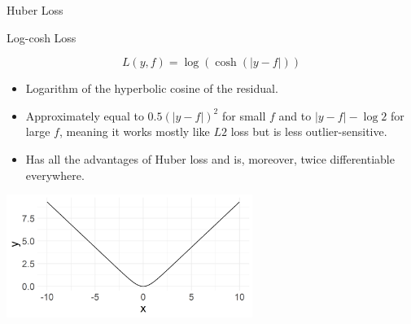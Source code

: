 \documentclass[11pt,compress,t,notes=noshow, xcolor=table]{beamer}
\begin{document}
\begin{vbframe}{Huber Loss}


\end{vbframe}

\begin{vbframe}{Log-cosh Loss}


$$
L(y,f) = \log \left( \cosh(\left|y - f\right|) \right)
$$

\normalsize
\begin{itemize}
\item Logarithm of the hyperbolic cosine of the residual.
\item Approximately equal to $0.5 (\left|y - f\right|)^2$ for small $f$ and to $\left|y - f\right| - \log 2$ for large $f$, meaning it works mostly like $L2$ loss but is less outlier-sensitive.
\item Has all the advantages of Huber loss and is, moreover, twice differentiable everywhere.
\end{itemize}

\vfill

\begin{center}
\includegraphics[width = 0.6\textwidth]{figure/loss_logcosh.png}
\end{center}

\end{vbframe}
\end{document}
